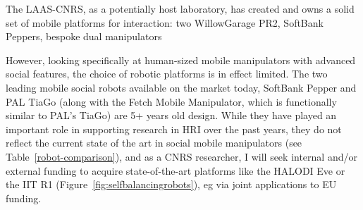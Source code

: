 The LAAS-CNRS, as a potentially host laboratory, has created and owns a solid
set of mobile platforms for interaction: two WillowGarage PR2, SoftBank Peppers,
bespoke dual manipulators

However, looking specifically at human-sized mobile manipulators with advanced
social features, the choice of robotic platforms is in effect limited.  The two
leading mobile social robots available on the market today, SoftBank Pepper and
PAL TiaGo (along with the Fetch Mobile Manipulator, which is functionally
similar to PAL's TiaGo) are 5+ years old design. While they have played an
important role in supporting research in HRI over the past years, they do not
reflect the current state of the art in social mobile manipulators (see
Table~\ref{robot-comparison}), and as a CNRS researcher, I will seek internal
and/or external funding to acquire state-of-the-art platforms like the HALODI
Eve or the IIT R1 (Figure~\ref{fig:selfbalancingrobots}), eg via joint
applications to EU funding.


